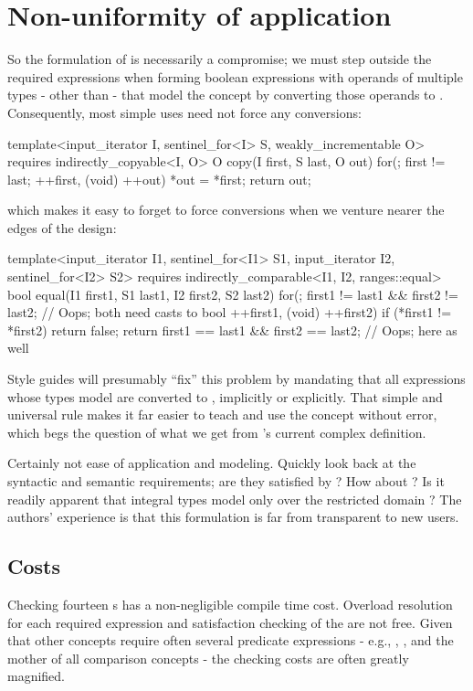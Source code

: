 \section{Non-uniformity of application}
So the formulation of  is necessarily a compromise; we must step outside the
required expressions when forming boolean expressions with operands of multiple types - other than
 - that model the concept by converting those operands to . Consequently,
most simple uses need not force any conversions:
\begin{codeblock}
template<input_iterator I, sentinel_for<I> S, weakly_incrementable O>
  requires indirectly_copyable<I, O>
O copy(I first, S last, O out) {
  for(; first != last; ++first, (void) ++out) {
    *out = *first;
  }
  return out;
}
\end{codeblock}
which makes it easy to forget to force conversions when we venture nearer the edges of the design:
\begin{codeblock}
template<input_iterator I1, sentinel_for<I1> S1, input_iterator I2, sentinel_for<I2> S2>
  requires indirectly_comparable<I1, I2, ranges::equal>
bool equal(I1 first1, S1 last1, I2 first2, S2 last2) {
  for(; first1 != last1 && first2 != last2; // Oops; both need casts to bool
      ++first1, (void) ++first2) {
    if (*first1 != *first2)
      return false;
  }
  return first1 == last1 && first2 == last2; // Oops; here as well
}
\end{codeblock}
Style guides will presumably ``fix'' this problem by mandating that all expressions whose types
model  are converted to , implicitly or explicitly. That simple and
universal rule makes it far easier to teach and use the concept without error, which begs the
question of what we get from 's current complex definition.

Certainly not ease of application and modeling. Quickly look back at the syntactic and semantic
requirements; are they satisfied by ? How about ? Is it readily apparent that
integral types  model  only over the restricted domain
? The authors' experience is that this formulation is far from transparent to
new users.

\subsection{Costs}
Checking fourteen s has a non-negligible compile time cost.
Overload resolution for each required expression and satisfaction checking of the
 are not free. Given that other concepts require often several
predicate expressions - e.g., , , and the
mother of all comparison concepts  - the checking costs are often
greatly magnified.

